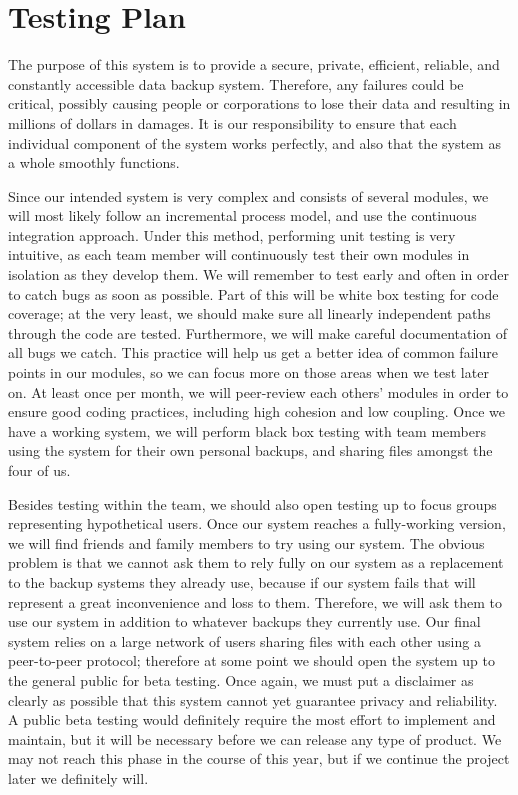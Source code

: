 \chapter{Testing Plan}

The purpose of this system is to provide a secure, private, efficient, reliable, and constantly accessible data backup system.  Therefore, any failures could be critical, possibly causing people or corporations to lose their data and resulting in millions of dollars in damages.  It is our responsibility to ensure that each individual component of the system works perfectly, and also that the system as a whole smoothly functions.

Since our intended system is very complex and consists of several modules, we will most likely follow an incremental process model, and use the continuous integration approach.  Under this method, performing unit testing is very intuitive, as each team member will continuously test their own modules in isolation as they develop them.  We will remember to test early and often in order to catch bugs as soon as possible.  Part of this will be white box testing for code coverage; at the very least, we should make sure all  linearly independent paths through the code are tested.  Furthermore, we will make careful documentation of all bugs we catch.  This practice will help us get a better idea of common failure points in our modules, so we can focus more on those areas when we test later on.  At least once per month, we will peer-review each others' modules in order to ensure good coding practices, including high cohesion and low coupling.  Once we have a working system, we will perform black box testing with team members using the system for their own personal backups, and sharing files amongst the four of us.

Besides testing within the team, we should also open testing up to focus groups representing hypothetical users.  Once our system reaches a fully-working version, we will find friends and family members to try using our system.  The obvious problem is that we cannot ask them to rely fully on our system as a replacement to the backup systems they already use, because if our system fails that will represent a great inconvenience and loss to them.  Therefore, we will ask them to use our system in addition to whatever backups they currently use.  Our final system relies on a large network of users sharing files with each other using a peer-to-peer protocol; therefore at some point we should open the system up to the general public for beta testing.  Once again, we must put a disclaimer as clearly as possible that this system cannot yet guarantee privacy and reliability.  A public beta testing would definitely require the most effort to implement and maintain, but it will be necessary before we can release any type of product.  We may not reach this phase in the course of this year, but if we continue the project later we definitely will.